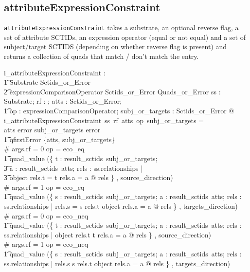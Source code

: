 \documentclass{article}
\def\spec#1{{\tt #1}}
\begin{document}
\subsection{attributeExpressionConstraint}
\spec{attributeExpressionConstraint} takes a substrate, an optional reverse flag, a set of attribute SCTIDs, an expression operator (equal or not equal) and a set of subject/target SCTIDS (depending on 
whether reverse flag is present) and returns a collection of quads that match / don't match the entry.
\begin{gendef}
   i\_attributeExpressionConstraint : \\ 
\t1 Substrate \fun \optional[reverseFlag] \fun Sctids\_or\_Error \fun \\
\t2 expressionComparisonOperator \fun Sctids\_or\_Error \fun Quads\_or\_Error
\where
   \forall ss : Substrate;  rf : \optional[reverseFlag]; atts : Sctids\_or\_Error; \\
\t1 op : expressionComparisonOperator; subj\_or\_targets : Sctids\_or\_Error @ \\
   i\_attributeExpressionConstraint~ss~rf~atts~op~subj\_or\_targets = \\
 \IF atts \in \ran error \lor subj\_or\_targets \in \ran error \\
\t1 \THEN qfirstError \{atts, subj\_or\_targets\} \\
 \ELSE \IF \# args.rf = 0 \land op = eco\_eq \THEN \\
\t1 quad\_value (\{ t : result\_sctids~subj\_or\_targets; \\
\t3 a : result\_sctids~atts; rels : ss.relationships | \\
\t3 object \inv rels.t = t \land rels.a = a @ rels \} , source\_direction) \\
\ELSE \IF \# args.rf = 1 \land op = eco\_eq \THEN \\
\t1 quad\_value (\{ s : result\_sctids~subj\_or\_targets; a : result\_sctids~atts; rels : ss.relationships | rels.s = s \land rels.t \in \ran object \land rels.a = a @ rels \} , targets\_direction) \\
 \ELSE \IF \# args.rf = 0 \land op = eco\_neq \THEN \\
\t1 quad\_value (\{ t : result\_sctids~subj\_or\_targets; a : result\_sctids~atts; rels : ss.relationships | object \inv rels.t \neq t \land rels.a = a @ rels \} , source\_direction) \\
 \ELSE \IF \# args.rf = 1 \land op = eco\_neq \THEN \\
\t1 quad\_value (\{ s : result\_sctids~subj\_or\_targets; a : result\_sctids~atts; rels : ss.relationships | rels.s \neq s \land rels.t \in \ran object \land rels.a = a @ rels \} , targets\_direction) 
\end{gendef}
\end{document}
